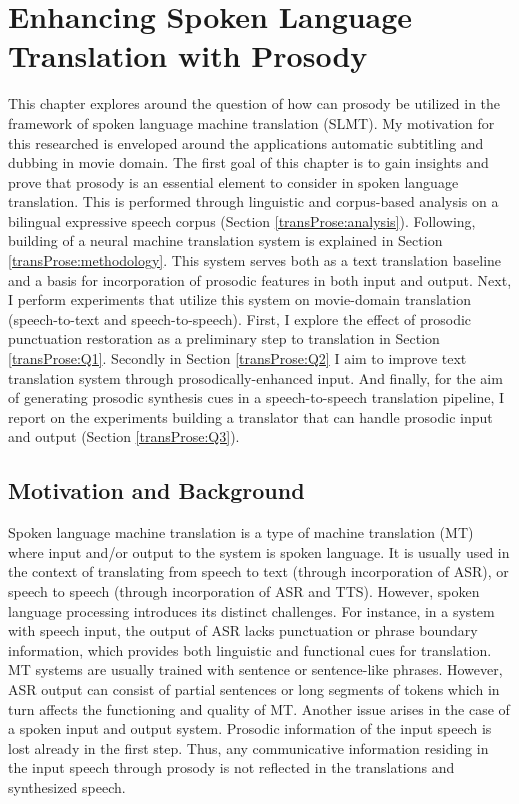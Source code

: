 \chapter{Enhancing Spoken Language Translation with Prosody}
\label{chapter:transProse}
This chapter explores around the question of how can prosody be utilized in the framework of spoken language machine translation (SLMT). My motivation for this researched is enveloped around the applications automatic subtitling and dubbing in movie domain. The first goal of this chapter is to gain insights and prove that prosody is an essential element to consider in spoken language translation. This is performed through linguistic and corpus-based analysis on a bilingual expressive speech corpus (Section \ref{transProse:analysis}). Following, building of a neural machine translation system is explained in Section \ref{transProse:methodology}. This system serves both as a text translation baseline and a basis for incorporation of prosodic features in both input and output. Next, I perform experiments that utilize this system on movie-domain translation (speech-to-text and speech-to-speech). First, I explore the effect of prosodic punctuation restoration as a preliminary step to translation in Section \ref{transProse:Q1}. Secondly in Section \ref{transProse:Q2} I aim to improve text translation system through prosodically-enhanced input. And finally, for the aim of generating prosodic synthesis cues in a speech-to-speech translation pipeline, I report on the experiments building a translator that can handle prosodic input and output (Section \ref{transProse:Q3}). 

\section{Motivation and Background}
Spoken language machine translation is a type of machine translation (MT) where input and/or output to the system is spoken language. It is usually used in the context of translating from speech to text (through incorporation of ASR), or speech to speech (through incorporation of ASR and TTS). However, spoken language processing introduces its distinct challenges. For instance, in a system with speech input, the output of ASR lacks punctuation or phrase boundary information, which provides both linguistic and functional cues for translation. MT systems are usually trained with sentence or sentence-like phrases. However, ASR output can consist of partial sentences or long segments of tokens which in turn affects the functioning and quality of MT. Another issue arises in the case of a spoken input and output system. Prosodic information of the input speech is lost already in the first step. Thus, any communicative information residing in the input speech through prosody is not reflected in the translations and synthesized speech. 

